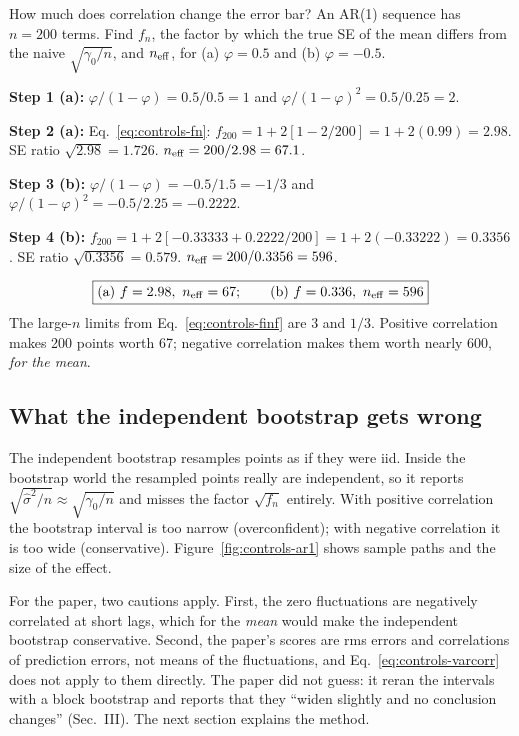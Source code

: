 \begin{sample}{How much does correlation change the error bar?}
An AR(1) sequence has $n=200$ terms. Find $f_n$, the factor by which the true SE of the mean differs from the naive $\sqrt{\gamma_0/n}$, and $n_{\rm eff}$, for (a) $\varphi=0.5$ and (b) $\varphi=-0.5$.

\textbf{Step 1 (a):} $\varphi/(1-\varphi)=0.5/0.5=1$ and $\varphi/(1-\varphi)^2=0.5/0.25=2$.

\textbf{Step 2 (a):} Eq.~\eqref{eq:controls-fn}: $f_{200}=1+2[1-2/200]=1+2(0.99)=2.98$. SE ratio $\sqrt{2.98}=1.726$. $n_{\rm eff}=200/2.98=67.1$.

\textbf{Step 3 (b):} $\varphi/(1-\varphi)=-0.5/1.5=-1/3$ and $\varphi/(1-\varphi)^2=-0.5/2.25=-0.2222$.

\textbf{Step 4 (b):} $f_{200}=1+2[-0.33333+0.2222/200]=1+2(-0.33222)=0.3356$. SE ratio $\sqrt{0.3356}=0.579$. $n_{\rm eff}=200/0.3356=596$.

\[
\boxed{\text{(a) }f=2.98,\ n_{\rm eff}=67;\qquad\text{(b) }f=0.336,\ n_{\rm eff}=596}
\]
The large-$n$ limits from Eq.~\eqref{eq:controls-finf} are $3$ and $1/3$. Positive correlation makes 200 points worth 67; negative correlation makes them worth nearly 600, \emph{for the mean}.
\end{sample}

\subsection{What the independent bootstrap gets wrong}

The independent bootstrap resamples points as if they were iid. Inside the bootstrap world the resampled points really are independent, so it reports $\sqrt{\hat\sigma^2/n}\approx\sqrt{\gamma_0/n}$ and misses the factor $\sqrt{f_n}$ entirely. With positive correlation the bootstrap interval is too narrow (overconfident); with negative correlation it is too wide (conservative). Figure~\ref{fig:controls-ar1} shows sample paths and the size of the effect.

For the paper, two cautions apply. First, the zero fluctuations are negatively correlated at short lags, which for the \emph{mean} would make the independent bootstrap conservative. Second, the paper's scores are rms errors and correlations of prediction errors, not means of the fluctuations, and Eq.~\eqref{eq:controls-varcorr} does not apply to them directly. The paper did not guess: it reran the intervals with a block bootstrap and reports that they ``widen slightly and no conclusion changes'' (Sec.~III). The next section explains the method.

